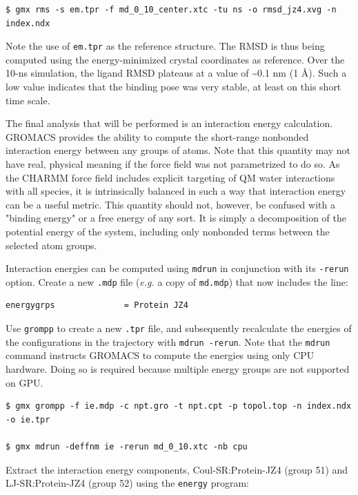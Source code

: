 \documentclass[9pt,tutorial,pubversion]{livecoms}
\begin{document}
\begin{lstlisting}
$ gmx rms -s em.tpr -f md_0_10_center.xtc -tu ns -o rmsd_jz4.xvg -n index.ndx
\end{lstlisting}
%
Note the use of \texttt{em.tpr} as the reference structure. The RMSD is thus being computed using the energy-minimized crystal coordinates as reference. Over the 10-ns simulation, the ligand RMSD plateaus at a value of \textasciitilde0.1 nm (1 \AA). Such a low value indicates that the binding pose was very stable, at least on this short time scale.

The final analysis that will be performed is an interaction energy calculation. GROMACS provides the ability to compute the short-range nonbonded interaction energy between any groups of atoms. Note that this quantity may not have real, physical meaning if the force field was not parametrized to do so. As the CHARMM force field includes explicit targeting of QM water interactions with all species, it is intrinsically balanced in such a way that interaction energy can be a useful metric. This quantity should not, however, be confused with a "binding energy" or a free energy of any sort. It is simply a decomposition of the potential energy of the system, including only nonbonded terms between the selected atom groups.

Interaction energies can be computed using \texttt{mdrun} in conjunction with its \texttt{-rerun} option. Create a new \texttt{.mdp} file ({\em e.g.} a copy of \texttt{md.mdp}) that now includes the line:

\begin{lstlisting}
energygrps              = Protein JZ4
\end{lstlisting}

Use \texttt{grompp} to create a new \texttt{.tpr} file, and subsequently recalculate the energies of the configurations in the trajectory with \texttt{mdrun -rerun}. Note that the \texttt{mdrun} command instructs GROMACS to compute the energies using only CPU hardware. Doing so is required because multiple energy groups are not supported on GPU.

\begin{lstlisting}
$ gmx grompp -f ie.mdp -c npt.gro -t npt.cpt -p topol.top -n index.ndx -o ie.tpr

$ gmx mdrun -deffnm ie -rerun md_0_10.xtc -nb cpu
\end{lstlisting}

Extract the interaction energy components, Coul-SR:Protein-JZ4 (group 51) and LJ-SR:Protein-JZ4 (group 52) using the \texttt{energy} program:
\end{document}
